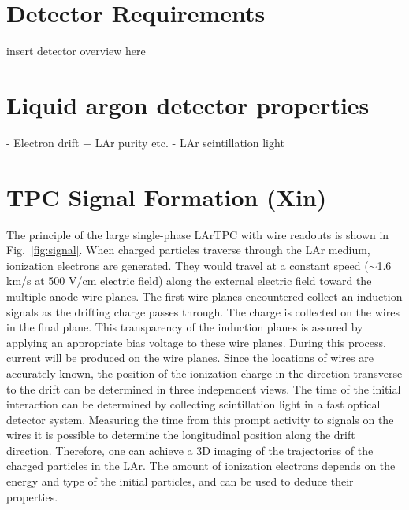 
\section{Detector Requirements}

insert detector overview here

\section{Liquid argon detector properties}
- Electron drift + LAr purity etc.
- LAr scintillation light 

\section{TPC Signal Formation (Xin)}\label{sec:tpc_signal_formation}

The principle of the large single-phase LArTPC with wire readouts is shown in 
Fig.~\ref{fig:signal}. When charged particles traverse through the LAr medium,
ionization electrons are generated. They would travel at a constant speed 
($\sim$1.6 km/s at 500 V/cm electric field) along the external electric field 
toward the multiple anode wire planes. The first wire planes encountered collect 
an induction signals as the drifting charge passes through.  The charge is collected 
on the wires in the final plane. This transparency of the induction planes is assured by 
applying an appropriate bias voltage to these wire planes.
During this process, current will be produced on the wire planes. 
Since the locations of wires are accurately known, the position of the
ionization charge in the direction transverse to the drift can be determined in 
three independent views. The time of the initial interaction can be determined by collecting 
scintillation light 
in a fast optical detector system.
Measuring the time from this prompt activity to signals on the wires it is 
possible to determine the longitudinal position along the drift direction.
Therefore, one can achieve a 3D imaging of the trajectories of the charged particles in the LAr. 
The amount of ionization electrons depends on the energy and type of
the initial particles, and can be used to deduce their properties.

